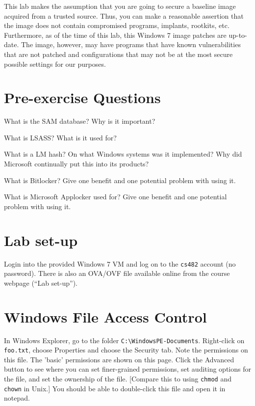 \documentclass{article}
\begin{document}
This lab makes the assumption that you are going to secure a baseline image acquired from a trusted source.  Thus, you can make a reasonable assertion that the image does not contain compromised programs, implants, rootkits, etc.  Furthermore, as of the time of this lab, this Windows 7 image patches are up-to-date. The image, however, may have programs that have known vulnerabilities that are not patched and configurations that may not be at the most secure possible settings for our purposes.  

\section{Pre-exercise Questions}

\question What is the SAM database? Why is it important?

\question What is LSASS?  What is it used for?

\question What is a LM hash? On what Windows systems was it implemented?  Why did Microsoft continually put this into its products?

\question What is Bitlocker? Give one benefit and one potential problem with using it.

\question What is Microsoft Applocker used for?  Give one benefit and one potential problem with using it.



\section{Lab set-up}

Login into the provided Windows 7 VM and log on to the {\tt cs482} account (no password).  There is also an OVA/OVF file available online from the course webpage (``Lab set-up''). 

\section{Windows File Access Control}
\indent In Windows Explorer, go to the folder {\tt C:\textbackslash WindowsPE-Documents}.  Right-click on {\tt foo.txt}, choose Properties and choose the Security tab. Note the permissions on this file. The 'basic' permissions are shown on this page. Click the Advanced button to see where you can set finer-grained permissions, set auditing options for the file, and set the ownership of the file. [Compare this to using {\tt chmod} and {\tt chown} in Unix.] You should be able to double-click this file and open it in notepad. 
\end{document}
